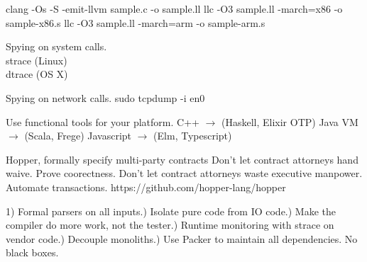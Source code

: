 \documentclass{beamer}
\begin{document}
\begin{frame}[fragile]
clang -Os -S -emit-llvm sample.c -o sample.ll\newline\newline
llc -O3 sample.ll -march=x86 -o sample-x86.s\newline\newline
llc -O3 sample.ll -march=arm -o sample-arm.s
\end{frame}

\begin{frame}[fragile]
Spying on system calls.\\
strace (Linux)\\ 
dtrace (OS X)
\end{frame}

\begin{frame}[fragile]
Spying on network calls.\newline\newline
sudo tcpdump -i en0
\end{frame}

\begin{frame}
Use functional tools for your platform.\newline\newline
C++ $\rightarrow$ (Haskell, Elixir OTP)\newline\newline
Java VM $\rightarrow$ (Scala, Frege)\newline\newline
Javascript $\rightarrow$ (Elm, Typescript)
\end{frame}

\begin{frame}
Hopper,  formally specify multi-party contracts\newline\newline
Don't let contract attorneys hand waive. Prove coorectness.\newline\newline
Don't let contract attorneys waste executive manpower. Automate transactions.\newline\newline
https://github.com/hopper-lang/hopper
\end{frame}

\begin{frame}
1) Formal parsers on all inputs.\newline{}) Isolate pure code from IO code.\newline{}) Make the compiler do more work, not the tester.\newline{}) Runtime monitoring with strace on vendor code.\newline{}) Decouple monoliths.\newline{}) Use Packer to maintain all dependencies. No black boxes.
\end{frame}
\end{document}
